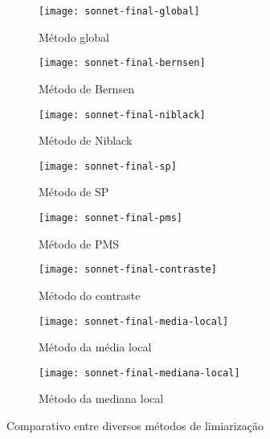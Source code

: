 \documentclass[brazilian,a4paper,twocolumn]{article}
\begin{document}
        \begin{figure}[H]
            \centering
            \begin{subfigure}{0.20\textwidth}
                \texttt{[image: sonnet-final-global]}
                \caption{Método global}
                \label{fig:sonnet-global}
            \end{subfigure}
            \begin{subfigure}{0.20\textwidth}
                \texttt{[image: sonnet-final-bernsen]}
                \caption{Método de Bernsen}
                \label{fig:sonnet-bernsen}
            \end{subfigure}
            \begin{subfigure}{0.20\textwidth}
                \texttt{[image: sonnet-final-niblack]}
                \caption{Método de Niblack}
                \label{fig:sonnet-niblack}
            \end{subfigure}
            \begin{subfigure}{0.20\textwidth}
                \texttt{[image: sonnet-final-sp]}
                \caption{Método de SP}
                \label{fig:sonnet-sp}
            \end{subfigure}
            \begin{subfigure}{0.20\textwidth}
                \texttt{[image: sonnet-final-pms]}
                \caption{Método de PMS}
                \label{fig:sonnet-pms}
            \end{subfigure}
            \begin{subfigure}{0.20\textwidth}
                \texttt{[image: sonnet-final-contraste]}
                \caption{Método do contraste}
                \label{fig:sonnet-contraste}
            \end{subfigure}
            \begin{subfigure}{0.20\textwidth}
                \texttt{[image: sonnet-final-media-local]}
                \caption{Método da média local}
                \label{fig:sonnet-media}
            \end{subfigure}
            \begin{subfigure}{0.20\textwidth}
                \texttt{[image: sonnet-final-mediana-local]}
                \caption{Método da mediana local}
                \label{fig:sonnet-mediana}
            \end{subfigure}

            \caption{Comparativo entre diversos métodos de limiarização}
            \label{fig:sonnet-limiarizacao}
        \end{figure}
\end{document}
